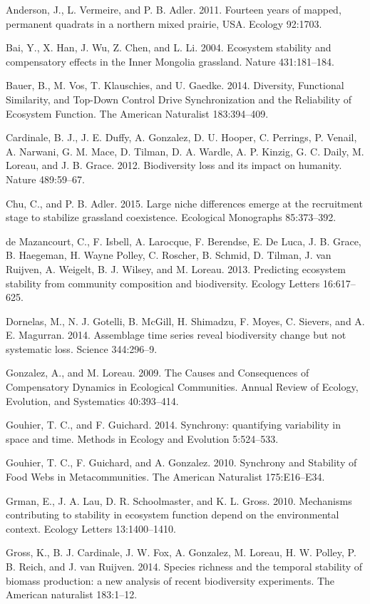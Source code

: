 \documentclass[12pt,]{article}
\begin{document}
Anderson, J., L. Vermeire, and P. B. Adler. 2011. Fourteen years of
mapped, permanent quadrats in a northern mixed prairie, USA. Ecology
92:1703.

Bai, Y., X. Han, J. Wu, Z. Chen, and L. Li. 2004. Ecosystem stability
and compensatory effects in the Inner Mongolia grassland. Nature
431:181--184.

Bauer, B., M. Vos, T. Klauschies, and U. Gaedke. 2014. Diversity,
Functional Similarity, and Top-Down Control Drive Synchronization and
the Reliability of Ecosystem Function. The American Naturalist
183:394--409.

Cardinale, B. J., J. E. Duffy, A. Gonzalez, D. U. Hooper, C. Perrings,
P. Venail, A. Narwani, G. M. Mace, D. Tilman, D. A. Wardle, A. P.
Kinzig, G. C. Daily, M. Loreau, and J. B. Grace. 2012. Biodiversity loss
and its impact on humanity. Nature 489:59--67.

Chu, C., and P. B. Adler. 2015. Large niche differences emerge at the
recruitment stage to stabilize grassland coexistence. Ecological
Monographs 85:373--392.

{{de Mazancourt}}, C., F. Isbell, A. Larocque, F. Berendse, E. {De
Luca}, J. B. Grace, B. Haegeman, H. {Wayne Polley}, C. Roscher, B.
Schmid, D. Tilman, J. van Ruijven, A. Weigelt, B. J. Wilsey, and M.
Loreau. 2013. Predicting ecosystem stability from community composition
and biodiversity. Ecology Letters 16:617--625.

Dornelas, M., N. J. Gotelli, B. McGill, H. Shimadzu, F. Moyes, C.
Sievers, and A. E. Magurran. 2014. Assemblage time series reveal
biodiversity change but not systematic loss. Science 344:296--9.

Gonzalez, A., and M. Loreau. 2009. The Causes and Consequences of
Compensatory Dynamics in Ecological Communities. Annual Review of
Ecology, Evolution, and Systematics 40:393--414.

Gouhier, T. C., and F. Guichard. 2014. Synchrony: quantifying
variability in space and time. Methods in Ecology and Evolution
5:524--533.

Gouhier, T. C., F. Guichard, and A. Gonzalez. 2010. Synchrony and
Stability of Food Webs in Metacommunities. The American Naturalist
175:E16--E34.

Grman, E., J. A. Lau, D. R. Schoolmaster, and K. L. Gross. 2010.
Mechanisms contributing to stability in ecosystem function depend on the
environmental context. Ecology Letters 13:1400--1410.

Gross, K., B. J. Cardinale, J. W. Fox, A. Gonzalez, M. Loreau, H. W.
Polley, P. B. Reich, and J. van Ruijven. 2014. Species richness and the
temporal stability of biomass production: a new analysis of recent
biodiversity experiments. The American naturalist 183:1--12.
\end{document}
